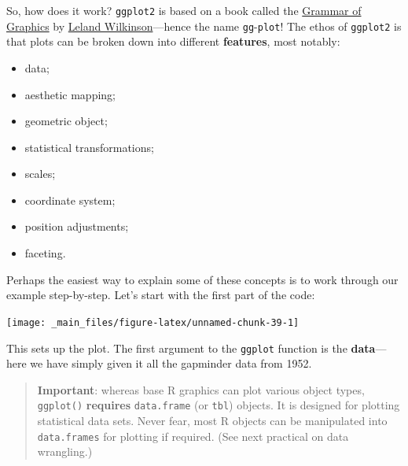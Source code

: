 \documentclass[]{book}
\newenvironment{Shaded}{\begin{snugshade}}{\end{snugshade}}
\newcommand{\KeywordTok}[1]{\textcolor[rgb]{0.13,0.29,0.53}{\textbf{{#1}}}}
\newcommand{\DataTypeTok}[1]{\textcolor[rgb]{0.13,0.29,0.53}{{#1}}}
\newcommand{\DecValTok}[1]{\textcolor[rgb]{0.00,0.00,0.81}{{#1}}}
\newcommand{\StringTok}[1]{\textcolor[rgb]{0.31,0.60,0.02}{{#1}}}
\newcommand{\NormalTok}[1]{{#1}}
\providecommand{\tightlist}{%
  \setlength{\itemsep}{0pt}\setlength{\parskip}{0pt}}
\theoremstyle{definition}
\theoremstyle{definition}
\theoremstyle{definition}
\theoremstyle{remark}
\begin{document}
So, how does it work? \texttt{ggplot2} is based on a book called the
\href{https://www.amazon.co.uk/Grammar-Graphics-Statistics-Computing/dp/0387245448}{Grammar
of Graphics} by
\href{https://en.wikipedia.org/wiki/Leland_Wilkinson}{Leland
Wilkinson}---hence the name \texttt{gg}-\texttt{plot}! The ethos of
\texttt{ggplot2} is that plots can be broken down into different
\textbf{features}, most notably:

\begin{itemize}
\tightlist
\item
  data;
\item
  aesthetic mapping;
\item
  geometric object;
\item
  statistical transformations;
\item
  scales;
\item
  coordinate system;
\item
  position adjustments;
\item
  faceting.
\end{itemize}

Perhaps the easiest way to explain some of these concepts is to work
through our example step-by-step. Let's start with the first part of the
code:

\begin{Shaded}
\end{Shaded}

\begin{center}\texttt{[image: \_main\_files/figure-latex/unnamed-chunk-39-1]} \end{center}

This sets up the plot. The first argument to the \texttt{ggplot}
function is the \textbf{data}---here we have simply given it all the
gapminder data from 1952.

\begin{quote}
\textbf{Important}: whereas base R graphics can plot various object
types, \texttt{ggplot()} \textbf{requires} \texttt{data.frame} (or
\texttt{tbl}) objects. It is designed for plotting statistical data
sets. Never fear, most R objects can be manipulated into
\texttt{data.frames} for plotting if required. (See next practical on
data wrangling.)
\end{quote}
\end{document}
